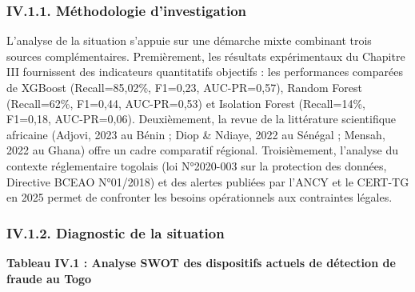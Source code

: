 \documentclass[
  12pt,
]{article}
\begin{document}
\subsubsection{IV.1.1. Méthodologie
d’investigation}\label{iv.1.1.-muxe9thodologie-dinvestigation}

L’analyse de la situation s’appuie sur une démarche mixte combinant
trois sources complémentaires. Premièrement, les résultats expérimentaux
du Chapitre III fournissent des indicateurs quantitatifs objectifs : les
performances comparées de XGBoost (Recall=85,02\%, F1=0,23,
AUC-PR=0,57), Random Forest (Recall=62\%, F1=0,44, AUC-PR=0,53) et
Isolation Forest (Recall=14\%, F1=0,18, AUC-PR=0,06). Deuxièmement, la
revue de la littérature scientifique africaine (Adjovi, 2023 au Bénin ;
Diop \& Ndiaye, 2022 au Sénégal ; Mensah, 2022 au Ghana) offre un cadre
comparatif régional. Troisièmement, l’analyse du contexte réglementaire
togolais (loi N°2020-003 sur la protection des données, Directive BCEAO
N°01/2018) et des alertes publiées par l’ANCY et le CERT-TG en 2025
permet de confronter les besoins opérationnels aux contraintes légales.

\subsubsection{IV.1.2. Diagnostic de la
situation}\label{iv.1.2.-diagnostic-de-la-situation}

\textbf{Tableau IV.1 : Analyse SWOT des dispositifs actuels de détection
de fraude au Togo}
\end{document}
